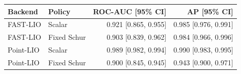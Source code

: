 \begin{tabular}{@{}llrr@{}}
\toprule
Backend & Policy & ROC-AUC [95\% CI] & AP [95\% CI]\\\midrule
FAST-LIO & Scalar & 0.921 [0.865, 0.955] & 0.985 [0.976, 0.991]\\
FAST-LIO & Fixed Schur & 0.903 [0.839, 0.962] & 0.984 [0.966, 0.996]\\
Point-LIO & Scalar & 0.989 [0.982, 0.994] & 0.990 [0.983, 0.995]\\
Point-LIO & Fixed Schur & 0.900 [0.845, 0.945] & 0.943 [0.900, 0.971]\\
\bottomrule
\end{tabular}
